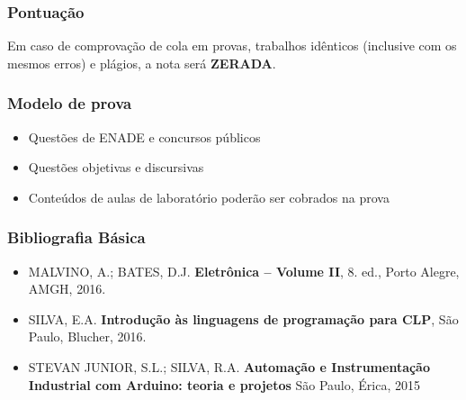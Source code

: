 \documentclass[aspectratio=169,
				xcolor=table]{beamer}
\begin{document}
	\begin{frame}
		\frametitle{Pontuação}
		\begin{center}
			\Huge \alert {Em caso de comprovação de cola em provas, trabalhos idênticos (inclusive com os mesmos erros) e plágios, a nota será \textbf{ZERADA}.}		
		\end{center}
	\end{frame}
	
	\begin{frame}
		\frametitle{Modelo de prova}
		\begin{itemize}
			\item Questões de ENADE e concursos públicos
			\vspace{1em}
			\item Questões objetivas e discursivas
			\vspace{1em}
			\item Conteúdos de aulas de laboratório poderão ser cobrados na prova
		\end{itemize}
	\end{frame}
	
	
	\begin{frame}
		\frametitle{Bibliografia Básica}
		\begin{itemize}
			\item MALVINO, A.; BATES, D.J. \textbf{Eletrônica – Volume II}, 8. ed., Porto Alegre, AMGH, 2016.
			\item SILVA, E.A. \textbf{Introdução às linguagens de programação para CLP}, São Paulo, Blucher, 2016.
			\vspace{1em} 
			\item STEVAN JUNIOR, S.L.; SILVA, R.A. \textbf{Automação e Instrumentação Industrial com Arduino: teoria e projetos} São Paulo, Érica, 2015
		\end{itemize}
	\end{frame}
	
\end{document}
